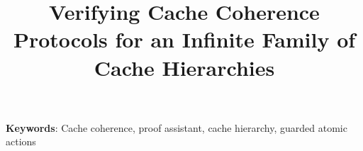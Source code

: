 
\title{Verifying Cache Coherence Protocols for an Infinite Family of Cache Hierarchies}




\author{
}

\date{}

\maketitle %


\begin{abstract}

\end{abstract}


\centerline{\footnotesize {\bf Keywords}: Cache coherence, proof assistant, cache hierarchy, guarded atomic actions}



